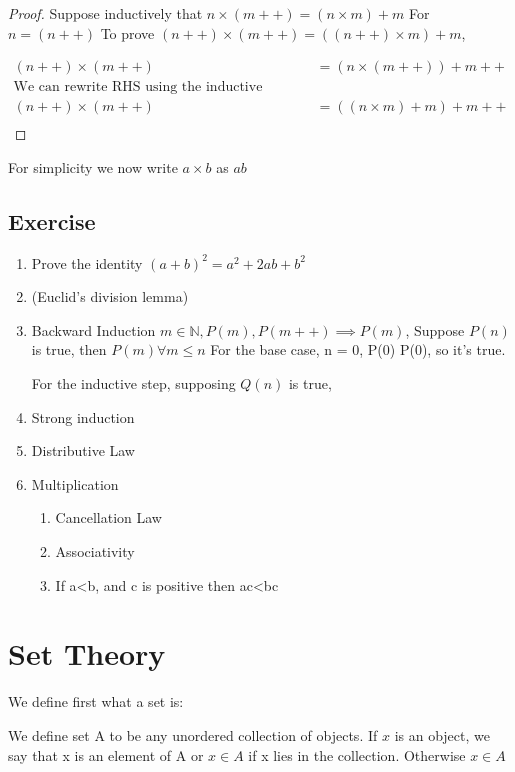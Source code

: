 \documentclass[11pt]{report}
\begin{document}
\begin{proof}
Suppose inductively that $n \times (m++) = (n \times m) + m$
For $n = (n++)$
To prove $(n++) \times (m++) = ((n++) \times m) + m$,

\begin{align*}
(n++) \times (m++) &= (n \times (m++)) + m++ \\
\text{We can rewrite RHS using the inductive hypothesis} \\
(n++) \times (m++) &= ((n \times m) + m) + m++\\

\end{align*}
\end{proof}

For simplicity we now write \(a \times b\) as \(ab\)
\section{Exercise}
\label{sec:org193c324}
\begin{enumerate}
\item Prove the identity \((a+b)^2 = a^2 + 2ab + b^2\)
\label{sec:org967b3a8}
\item (Euclid's division lemma)
\label{sec:orge18ada2}
\item Backward Induction
\label{sec:orgcf9c41f}
\(m \in \mathbb{N}, P(m), P(m++) \implies P(m)\), Suppose \(P(n)\) is true, then \(P(m) \forall m \le n\)
For the base case, n = 0,
P(0) \implies P(0), so it's true.

For the inductive step, supposing \(Q(n)\) is true,
\item Strong induction
\label{sec:orgafa2455}
\item Distributive Law
\label{sec:org277064c}
\item Multiplication
\label{sec:org2dceeac}
\begin{enumerate}
\item Cancellation Law
\label{sec:org52747da}
\item Associativity
\label{sec:org01513dc}
\item If a<b, and c is positive then ac<bc
\label{sec:org1e264d3}
\end{enumerate}
\end{enumerate}
\chapter{Set Theory}
\label{sec:org70c3cb2}
We define first what a set is:

\begin{definition}[Sets]
We define set A to be any unordered collection of objects. If $x$ is an object, we say that x is an element of A or $x \in A$ if x lies in the collection. Otherwise $x \in A$
\end{definition}
\end{document}
